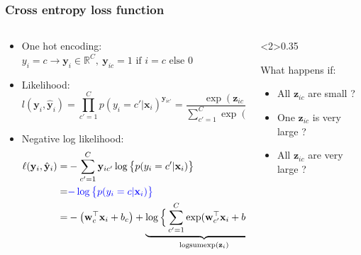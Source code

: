 \documentclass[pressentation,10pt,aspectratio=169,xcolor=table, colorlinks=true]{beamer}
\begin{document}
\begin{frame}
  \frametitle{Cross entropy loss function}
  \begin{columns}
    \begin{column}{0.65\linewidth}
      \begin{itemize}
      \item One hot encoding: \( y_i = c \rightarrow \mathbf{y}_{i} \in\mathbb{R}^C,\ \mathbf{y}_{ic}=1 \text{ if }i=c \text{ else } 0\)
      \item Likelihood:        
        \[l(\mathbf{y}_i, \hat{\mathbf{y}}_i) = \prod_{c'=1}^C p(y_i=c'|\mathbf{x}_i)^{\mathbf{y}_{ic'}} = \frac{\exp(\mathbf{z}_{ic})}{\sum_{c'=1}^C\exp(\mathbf{z}_{ic'})}\]
      \item <2-> Negative log likelihood:
        \begin{align*}
          \ell(\mathbf{y}_i, \hat{\mathbf{y}}_i) =& - \sum_{c'=1}^C\mathbf{y}_{ic'}\log\big\{p(y_i=c'|\mathbf{x}_i)\big\} \\
                                                 =& \textcolor{blue}{-\log\big\{p(y_i=c|\mathbf{x}_i)\big\}}\\
                                                 =& - \big(\mathbf{w}_{c}^\top\mathbf{x}_i + b_{c}\big) + \underbrace{\log\Big\{\sum_{c'=1}^C\exp(\mathbf{w}_{c'}^\top\mathbf{x}_i + b_{c'})\Big\}}_{\text{logsumexp}(\mathbf{z}_i)}
        \end{align*}
      \end{itemize}
    \end{column}
    \begin{column}<2>{0.35\linewidth}
      \begin{center}
      \end{center}

      \begin{work}
        What happens if:
        \begin{itemize}
        \item All \(\mathbf{z}_{ic}\) are small ?
        \item One \(\mathbf{z}_{ic}\) is very large ?
        \item All \(\mathbf{z}_{ic}\) are very large ?
        \end{itemize}
      \end{work}
    \end{column}
  \end{columns}
\end{frame}
\end{document}
